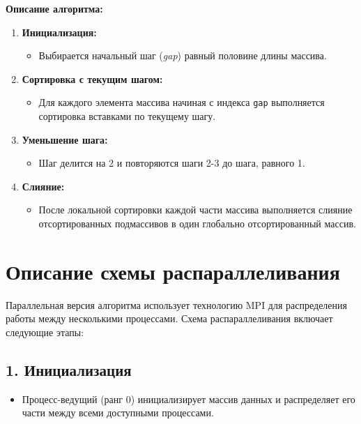 \documentclass[12pt]{article}
\begin{document}
\textbf{Описание алгоритма:}
\begin{enumerate}
    \item \textbf{Инициализация:}
        \begin{itemize}
            \item Выбирается начальный шаг (\textit{gap}) равный половине длины массива.
        \end{itemize}
    \item \textbf{Сортировка с текущим шагом:}
        \begin{itemize}
            \item Для каждого элемента массива начиная с индекса \texttt{gap} выполняется сортировка вставками по текущему шагу.
        \end{itemize}
    \item \textbf{Уменьшение шага:}
        \begin{itemize}
            \item Шаг делится на 2 и повторяются шаги 2-3 до шага, равного 1.
        \end{itemize}
    \item \textbf{Слияние:}
        \begin{itemize}
            \item После локальной сортировки каждой части массива выполняется слияние отсортированных подмассивов в один глобально отсортированный массив.
        \end{itemize}
\end{enumerate}

\section*{Описание схемы распараллеливания}
Параллельная версия алгоритма использует технологию MPI для распределения работы между несколькими процессами. Схема распараллеливания включает следующие этапы:

\subsection*{1. Инициализация}
\begin{itemize}
    \item Процесс-ведущий (ранг 0) инициализирует массив данных и распределяет его части между всеми доступными процессами.
\end{itemize}
\end{document}
